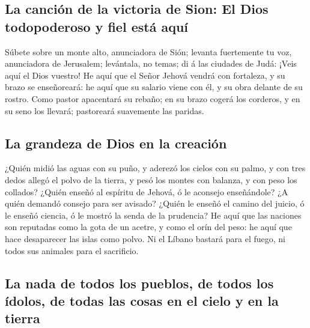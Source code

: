 \hypertarget{la-canciuxf3n-de-la-victoria-de-sion-el-dios-todopoderoso-y-fiel-estuxe1-aquuxed}{%
\subsection{La canción de la victoria de Sion: El Dios todopoderoso y
fiel está
aquí}\label{la-canciuxf3n-de-la-victoria-de-sion-el-dios-todopoderoso-y-fiel-estuxe1-aquuxed}}

 Súbete sobre un monte alto, anunciadora de Sión; levanta
fuertemente tu voz, anunciadora de Jerusalem; levántala, no temas; di á
las ciudades de Judá: ¡Veis aquí el Dios vuestro!  He aquí
que el Señor Jehová vendrá con fortaleza, y su brazo se enseñoreará: he
aquí que su salario viene con él, y su obra delante de su rostro.
 Como pastor apacentará su rebaño; en su brazo cogerá los
corderos, y en su seno los llevará; pastoreará suavemente las paridas.

\hypertarget{la-grandeza-de-dios-en-la-creaciuxf3n}{%
\subsection{La grandeza de Dios en la
creación}\label{la-grandeza-de-dios-en-la-creaciuxf3n}}

 ¿Quién midió las aguas con su puño, y aderezó los cielos
con su palmo, y con tres dedos allegó el polvo de la tierra, y pesó los
montes con balanza, y con peso los collados?  ¿Quién enseñó
al espíritu de Jehová, ó le aconsejo enseñándole?  ¿A quién
demandó consejo para ser avisado? ¿Quién le enseñó el camino del juicio,
ó le enseñó ciencia, ó le mostró la senda de la prudencia? 
He aquí que las naciones son reputadas como la gota de un acetre, y como
el orín del peso: he aquí que hace desaparecer las islas como polvo.
 Ni el Líbano bastará para el fuego, ni todos sus animales
para el sacrificio.

\hypertarget{la-nada-de-todos-los-pueblos-de-todos-los-uxeddolos-de-todas-las-cosas-en-el-cielo-y-en-la-tierra}{%
\subsection{La nada de todos los pueblos, de todos los ídolos, de todas
las cosas en el cielo y en la
tierra}\label{la-nada-de-todos-los-pueblos-de-todos-los-uxeddolos-de-todas-las-cosas-en-el-cielo-y-en-la-tierra}}

